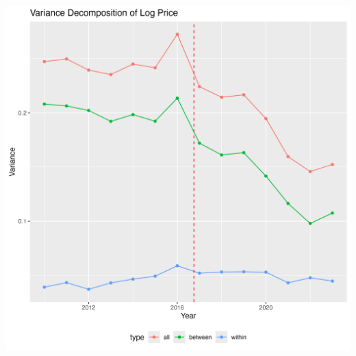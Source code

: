 \documentclass[12pt]{article}
\begin{document}
\includegraphics[width=\textwidth]{text/variance_decomposition.png}
\end{document}
